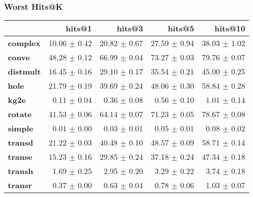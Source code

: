 \documentclass{article}
\begin{document}
    \subsubsection{Worst Hits@K}
    \begin{center}
    \begin{tabular}{lrrrr}
\toprule
{} &        hits@1 &        hits@3 &        hits@5 &       hits@10 \\
\midrule
\textbf{complex } &  10.06 $\pm$ 0.42 &  20.82 $\pm$ 0.67 &  27.59 $\pm$ 0.94 &  38.03 $\pm$ 1.02 \\
\textbf{conve   } &  48.28 $\pm$ 0.12 &  66.99 $\pm$ 0.04 &  73.27 $\pm$ 0.03 &  79.76 $\pm$ 0.07 \\
\textbf{distmult} &  16.45 $\pm$ 0.16 &  29.10 $\pm$ 0.17 &  35.54 $\pm$ 0.21 &  45.00 $\pm$ 0.25 \\
\textbf{hole    } &  21.79 $\pm$ 0.19 &  39.69 $\pm$ 0.24 &  48.06 $\pm$ 0.30 &  58.84 $\pm$ 0.28 \\
\textbf{kg2e    } &   0.11 $\pm$ 0.04 &   0.36 $\pm$ 0.08 &   0.56 $\pm$ 0.10 &   1.01 $\pm$ 0.14 \\
\textbf{rotate  } &  41.53 $\pm$ 0.06 &  64.14 $\pm$ 0.07 &  71.23 $\pm$ 0.05 &  78.67 $\pm$ 0.08 \\
\textbf{simple  } &   0.01 $\pm$ 0.00 &   0.03 $\pm$ 0.01 &   0.05 $\pm$ 0.01 &   0.08 $\pm$ 0.02 \\
\textbf{transd  } &  21.22 $\pm$ 0.03 &  40.48 $\pm$ 0.10 &  48.57 $\pm$ 0.09 &  58.71 $\pm$ 0.14 \\
\textbf{transe  } &  15.23 $\pm$ 0.16 &  29.85 $\pm$ 0.24 &  37.18 $\pm$ 0.24 &  47.34 $\pm$ 0.18 \\
\textbf{transh  } &   1.69 $\pm$ 0.25 &   2.95 $\pm$ 0.20 &   3.29 $\pm$ 0.22 &   3.74 $\pm$ 0.18 \\
\textbf{transr  } &   0.37 $\pm$ 0.00 &   0.63 $\pm$ 0.04 &   0.78 $\pm$ 0.06 &   1.03 $\pm$ 0.07 \\
\bottomrule
\end{tabular}

    \end{center}
\end{document}
